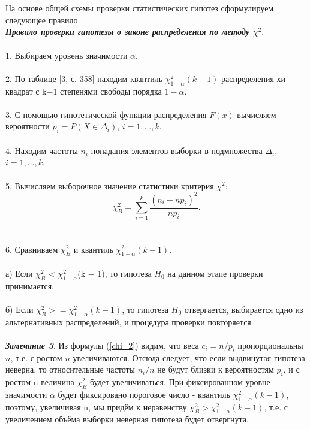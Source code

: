 \documentclass[a4paper,14pt]{article}
\begin{document}
	\\\\
	На основе общей схемы проверки статистических гипотез сформулируем следующее правило.
	\\
	\textbf{\textit{Правило проверки гипотезы о законе распределения по методу $\chi^{2}$}}.
	\\\\
	1. Выбираем уровень значимости $\alpha$.
	\\\\
	2. По таблице [3, с. 358] находим квантиль $\chi^{2}_{1-\alpha}(k - 1)$ распределения хи-квадрат с k$-$1 степенями свободы порядка $1-\alpha$. 
	\\\\
	3. С помощью гипотетической функции распределения $F(x)$ вычисляем вероятности $p_{i} = P (X \in \Delta_{i})$, $i = 1, ... ,k$.
	\\\\
	4. Находим частоты $n_{i}$ попадания элементов выборки в подмножества $\Delta_{i}$, $i = 1, ... ,k$. 
	\\\\
	5. Вычисляем выборочное значение статистики критерия $\chi^{2}$:
	\begin{equation}
		\chi^{2}_{B} =\sum_{i = 1}^{k}{\frac{(n_{i} - np_{i})^{2}}{np_{i}}}.
		\label{chi_B}
	\end{equation}
	\\\\
	6. Сравниваем $\chi^{2}_{B}$ и квантиль $\chi^{2}_{1-\alpha}(k-1)$.
	\\\\
	а) Если $\chi^{2}_{B}$ < $\chi^{2}_{1-\alpha}$(k $-$ 1), то гипотеза $H_{0}$ на данном этапе проверки принимается. 
	\\\\
	б) Если $\chi^{2}_{B} >= \chi^{2}_{1-\alpha}(k -1)$, то гипотеза $H_{0}$ отвергается, выбирается одно из альтернативных распределений, и процедура проверки повторяется.
	\\\\
	\textbf{\textit{Замечание 3}}. Из формулы (\ref{chi_2}) видим, что веса $c_i = n/p_{i}$ пропорциональны $n$, т.е. с ростом $n$ увеличиваются. Отсюда следует, что если выдвинутая гипотеза неверна, то относительные частоты $n_{i}/n$ не будут близки к вероятностям $p_{i}$, и с ростом n величина  $\chi^{2}_{B}$  будет увеличиваться. При фиксированном уровне значимости $\alpha$ будет фиксировано пороговое число - квантиль $\chi^{2}_{1-\alpha}(k-1)$, поэтому, увеличивая n, мы придём к неравенству $\chi^{2}_{B} > \chi^{2}_{1-\alpha}(k-1)$, т.е. с увеличением объёма выборки неверная гипотеза будет отвергнута.
\end{document}
